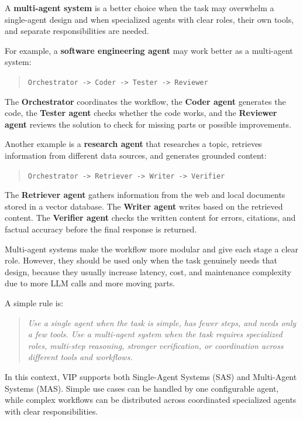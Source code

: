 A \textbf{multi-agent system} is a better choice when the task may overwhelm a single-agent design and when specialized agents with clear roles, their own tools, and separate responsibilities are needed.

For example, a \textbf{software engineering agent} may work better as a multi-agent system:

\begin{quote}
\texttt{Orchestrator -> Coder -> Tester -> Reviewer}
\end{quote}

The \textbf{Orchestrator} coordinates the workflow, the \textbf{Coder agent} generates the code, the \textbf{Tester agent} checks whether the code works, and the \textbf{Reviewer agent} reviews the solution to check for missing parts or possible improvements.

Another example is a \textbf{research agent} that researches a topic, retrieves information from different data sources, and generates grounded content:

\begin{quote}
\texttt{Orchestrator -> Retriever -> Writer -> Verifier}
\end{quote}

The \textbf{Retriever agent} gathers information from the web and local documents stored in a vector database. The \textbf{Writer agent} writes based on the retrieved content. The \textbf{Verifier agent} checks the written content for errors, citations, and factual accuracy before the final response is returned.

Multi-agent systems make the workflow more modular and give each stage a clear role. However, they should be used only when the task genuinely needs that design, because they usually increase latency, cost, and maintenance complexity due to more LLM calls and more moving parts.

A simple rule is:

\begin{quote}
\textit{Use a single agent when the task is simple, has fewer steps, and needs only a few tools. Use a multi-agent system when the task requires specialized roles, multi-step reasoning, stronger verification, or coordination across different tools and workflows.}
\end{quote}

In this context, VIP supports both Single-Agent Systems (SAS) and Multi-Agent Systems (MAS). Simple use cases can be handled by one configurable agent, while complex workflows can be distributed across coordinated specialized agents with clear responsibilities.

